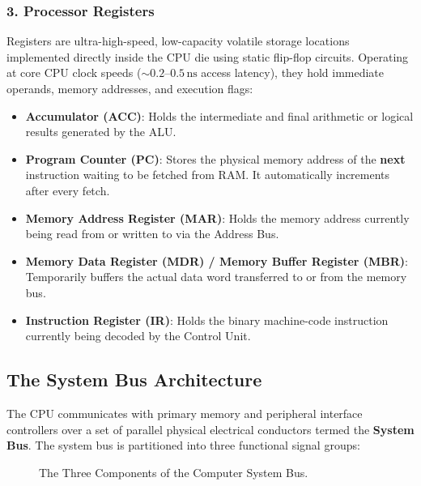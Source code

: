 \subsubsection{3. Processor Registers}
Registers are ultra-high-speed, low-capacity volatile storage locations implemented directly inside the CPU die using static flip-flop circuits. Operating at core CPU clock speeds ($\sim 0.2\text{--}0.5\,\text{ns}$ access latency), they hold immediate operands, memory addresses, and execution flags:
\begin{itemize}
    \item \textbf{Accumulator (ACC)}: Holds the intermediate and final arithmetic or logical results generated by the ALU.
    \item \textbf{Program Counter (PC)}: Stores the physical memory address of the \textbf{next} instruction waiting to be fetched from RAM. It automatically increments after every fetch.
    \item \textbf{Memory Address Register (MAR)}: Holds the memory address currently being read from or written to via the Address Bus.
    \item \textbf{Memory Data Register (MDR) / Memory Buffer Register (MBR)}: Temporarily buffers the actual data word transferred to or from the memory bus.
    \item \textbf{Instruction Register (IR)}: Holds the binary machine-code instruction currently being decoded by the Control Unit.
\end{itemize}

\subsection{The System Bus Architecture}

The CPU communicates with primary memory and peripheral interface controllers over a set of parallel physical electrical conductors termed the \textbf{System Bus}. The system bus is partitioned into three functional signal groups:

\begin{figure}[htbp]
\centering
{}
\caption{The Three Components of the Computer System Bus.}
\label{fig:system-bus-architecture}
\end{figure}

